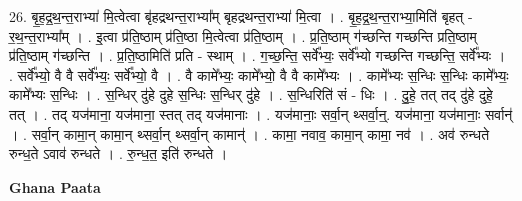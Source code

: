 \documentclass[17pt]{extarticle}
\begin{document}
26. बृ॒ह॒द्र॒थ॒न्त॒राभ्या॑ मि॒त्वेत्वा बृ॑हद्रथन्त॒राभ्या᳚म् बृहद्रथन्त॒राभ्या॑ मि॒त्वा । . बृ॒ह॒द्र॒थ॒न्त॒राभ्या॒मिति॑ बृहत् - र॒थ॒न्त॒राभ्या᳚म् । . इ॒त्वा प्र॑ति॒ष्ठाम् प्र॑ति॒ष्ठा मि॒त्वेत्वा प्र॑ति॒ष्ठाम् । . प्र॒ति॒ष्ठाम् ग॑च्छन्ति गच्छन्ति प्रति॒ष्ठाम् प्र॑ति॒ष्ठाम् ग॑च्छन्ति । . प्र॒ति॒ष्ठामिति॑ प्रति - स्थाम् । . ग॒च्छ॒न्ति॒ सर्वे᳚भ्यः॒ सर्वे᳚भ्यो गच्छन्ति गच्छन्ति॒ सर्वे᳚भ्यः । . सर्वे᳚भ्यो॒ वै वै सर्वे᳚भ्यः॒ सर्वे᳚भ्यो॒ वै । . वै कामे᳚भ्यः॒ कामे᳚भ्यो॒ वै वै कामे᳚भ्यः । . कामे᳚भ्यः स॒न्धिः स॒न्धिः कामे᳚भ्यः॒ कामे᳚भ्यः स॒न्धिः । . स॒न्धिर् दु॑हे दुहे स॒न्धिः स॒न्धिर् दु॑हे । . स॒न्धिरिति॑ सं - धिः । . दु॒हे॒ तत् तद् दु॑हे दुहे॒ तत् । . तद् यज॑माना॒ यज॑माना॒ स्तत् तद् यज॑मानाः । . यज॑मानाः॒ सर्वा॒न् थ्सर्वा॒न्॒. यज॑माना॒ यज॑मानाः॒ सर्वान्॑ । . सर्वा॒न् कामा॒न् कामा॒न् थ्सर्वा॒न् थ्सर्वा॒न् कामान्॑ । . कामा॒ नवाव॒ कामा॒न् कामा॒ नव॑ । . अव॑ रुन्धते रुन्ध॒ते ऽवाव॑ रुन्धते । . रु॒न्ध॒त॒ इति॑ रुन्धते । \newline

\textbf{Ghana Paata } \newline
\end{document}
